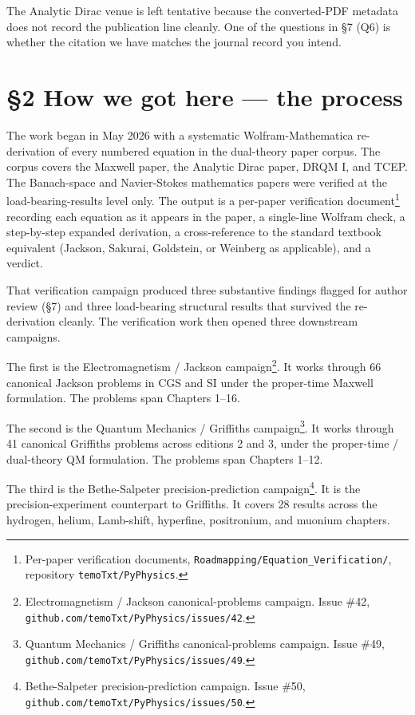 \documentclass[
  11pt,
]{article}
\begin{document}
The Analytic Dirac venue is left tentative because the converted-PDF
metadata does not record the publication line cleanly. One of the
questions in §7 (Q6) is whether the citation we have matches the journal
record you intend.

\hypertarget{how-we-got-here-the-process}{%
\section{§2 How we got here --- the
process}\label{how-we-got-here-the-process}}

The work began in May 2026 with a systematic Wolfram-Mathematica
re-derivation of every numbered equation in the dual-theory paper
corpus. The corpus covers the Maxwell paper, the Analytic Dirac paper,
DRQM I, and TCEP. The Banach-space and Navier-Stokes mathematics papers
were verified at the load-bearing-results level only. The output is a
per-paper verification document\footnote{Per-paper verification
  documents, \texttt{Roadmapping/Equation\_Verification/}, repository
  \texttt{temoTxt/PyPhysics}.} recording each equation as it appears in
the paper, a single-line Wolfram check, a step-by-step expanded
derivation, a cross-reference to the standard textbook equivalent
(Jackson, Sakurai, Goldstein, or Weinberg as applicable), and a verdict.

That verification campaign produced three substantive findings flagged
for author review (§7) and three load-bearing structural results that
survived the re-derivation cleanly. The verification work then opened
three downstream campaigns.

The first is the Electromagnetism / Jackson campaign\footnote{Electromagnetism
  / Jackson canonical-problems campaign. Issue \#42,
  \texttt{github.com/temoTxt/PyPhysics/issues/42}.}. It works through 66
canonical Jackson problems in CGS and SI under the proper-time Maxwell
formulation. The problems span Chapters 1--16.

The second is the Quantum Mechanics / Griffiths campaign\footnote{Quantum
  Mechanics / Griffiths canonical-problems campaign. Issue \#49,
  \texttt{github.com/temoTxt/PyPhysics/issues/49}.}. It works through 41
canonical Griffiths problems across editions 2 and 3, under the
proper-time / dual-theory QM formulation. The problems span Chapters
1--12.

The third is the Bethe-Salpeter precision-prediction
campaign\footnote{Bethe-Salpeter precision-prediction campaign. Issue
  \#50, \texttt{github.com/temoTxt/PyPhysics/issues/50}.}. It is the
precision-experiment counterpart to Griffiths. It covers 28 results
across the hydrogen, helium, Lamb-shift, hyperfine, positronium, and
muonium chapters.
\end{document}
